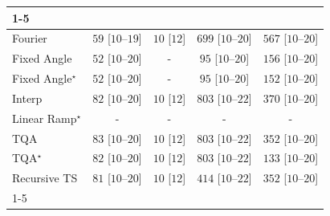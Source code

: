 \begin{tabular}{l|cccc|}
\cline{1-5}
\multicolumn{5}{c}{\rule{0pt}{8pt}SV} \\
\midrule
Fourier & {\cellcolor[HTML]{EFF9EB}} \color[HTML]{000000} $59$ [$10$--$19$] & {\cellcolor[HTML]{F7FCF5}} \color[HTML]{000000} $10$ [$12$] & {\cellcolor[HTML]{016E2D}} \color[HTML]{F1F1F1} $699$ [$10$--$20$] & {\cellcolor[HTML]{2F974E}} \color[HTML]{F1F1F1} $567$ [$10$--$20$] \\
Fixed Angle & {\cellcolor[HTML]{F0F9EC}} \color[HTML]{000000} $52$ [$10$--$20$] & {\cellcolor[HTML]{000000}} \color[HTML]{F1F1F1} {\cellcolor{white}} \color{black} - & {\cellcolor[HTML]{E8F6E3}} \color[HTML]{000000} $95$ [$10$--$20$] & {\cellcolor[HTML]{D7EFD1}} \color[HTML]{000000} $156$ [$10$--$20$] \\
Fixed Angle$^\star$ & {\cellcolor[HTML]{F0F9EC}} \color[HTML]{000000} $52$ [$10$--$20$] & {\cellcolor[HTML]{000000}} \color[HTML]{F1F1F1} {\cellcolor{white}} \color{black} - & {\cellcolor[HTML]{E8F6E3}} \color[HTML]{000000} $95$ [$10$--$20$] & {\cellcolor[HTML]{D9F0D3}} \color[HTML]{000000} $152$ [$10$--$20$] \\
Interp & {\cellcolor[HTML]{EAF7E6}} \color[HTML]{000000} $82$ [$10$--$20$] & {\cellcolor[HTML]{F7FCF5}} \color[HTML]{000000} $10$ [$12$] & {\cellcolor[HTML]{00441B}} \color[HTML]{F1F1F1} $803$ [$10$--$22$] & {\cellcolor[HTML]{84CC83}} \color[HTML]{000000} $370$ [$10$--$20$] \\
Linear Ramp$^\star$ & {\cellcolor[HTML]{000000}} \color[HTML]{F1F1F1} {\cellcolor{white}} \color{black} - & {\cellcolor[HTML]{000000}} \color[HTML]{F1F1F1} {\cellcolor{white}} \color{black} - & {\cellcolor[HTML]{000000}} \color[HTML]{F1F1F1} {\cellcolor{white}} \color{black} - & {\cellcolor[HTML]{000000}} \color[HTML]{F1F1F1} {\cellcolor{white}} \color{black} - \\
TQA & {\cellcolor[HTML]{EAF7E6}} \color[HTML]{000000} $83$ [$10$--$20$] & {\cellcolor[HTML]{F7FCF5}} \color[HTML]{000000} $10$ [$12$] & {\cellcolor[HTML]{00441B}} \color[HTML]{F1F1F1} $803$ [$10$--$22$] & {\cellcolor[HTML]{8DD08A}} \color[HTML]{000000} $352$ [$10$--$20$] \\
TQA$^\star$ & {\cellcolor[HTML]{EAF7E6}} \color[HTML]{000000} $82$ [$10$--$20$] & {\cellcolor[HTML]{F7FCF5}} \color[HTML]{000000} $10$ [$12$] & {\cellcolor[HTML]{00441B}} \color[HTML]{F1F1F1} $803$ [$10$--$22$] & {\cellcolor[HTML]{DEF2D9}} \color[HTML]{000000} $133$ [$10$--$20$] \\
Recursive TS & {\cellcolor[HTML]{EBF7E7}} \color[HTML]{000000} $81$ [$10$--$20$] & {\cellcolor[HTML]{F7FCF5}} \color[HTML]{000000} $10$ [$12$] & {\cellcolor[HTML]{70C274}} \color[HTML]{000000} $414$ [$10$--$22$] & {\cellcolor[HTML]{8DD08A}} \color[HTML]{000000} $352$ [$10$--$20$] \\
\cline{1-5}
\bottomrule
\end{tabular}
